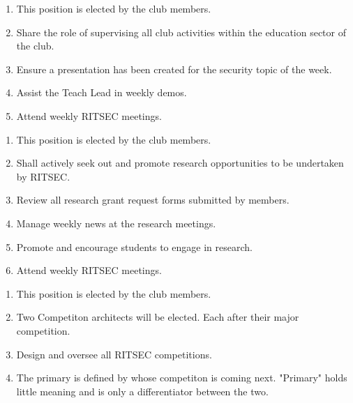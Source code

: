 
\begin{enumerate}
  \item This position is elected by the club members.
  \item Share the role of supervising all club activities within the education
    sector of the club.
  \item Ensure a presentation has been created for the security topic of the
    week.
  \item Assist the Teach Lead in weekly demos.
  \item Attend weekly RITSEC meetings.
\end{enumerate}


\begin{enumerate}
  \item This position is elected by the club members.
  \item Shall actively seek out and promote research opportunities to be
    undertaken by RITSEC.
  \item Review all research grant request forms submitted by members. 
  \item Manage weekly news at the research meetings.
  \item Promote and encourage students to engage in research.
  \item Attend weekly RITSEC meetings.
\end{enumerate}


\begin{enumerate}
  \item This position is elected by the club members.
  \item Two Competiton architects will be elected. Each after their major competition.
  \item Design and oversee all RITSEC competitions.
  \item The primary is defined by whose competiton is coming next.
  \itme "Primary" holds little meaning and is only a differentiator between the two.
\end{enumerate}


